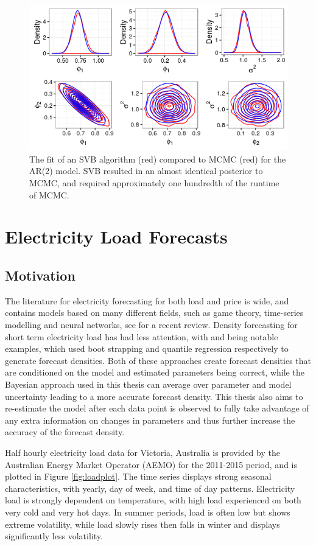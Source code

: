 \documentclass[12pt,a4paper]{article}%
\numberwithin{equation}{section}
\begin{document}
\begin{figure}[h]
\centering
\includegraphics[width=0.7\linewidth,height=\textheight,keepaspectratio]{VBfit.png}
\caption{The fit of an SVB algorithm (red) compared to MCMC (red) for the AR(2) model. SVB resulted in an almost identical posterior to MCMC, and required approximately one hundredth of the runtime of MCMC.}
\label{fig:VBfit}
\end{figure}

\section{Electricity Load Forecasts} \label{sec:ElecLoad}
\subsection{Motivation}

The literature for electricity forecasting for both load and price is wide, and contains models based on many different fields, such as game theory, time-series modelling and neural networks, see \citet{Weron2014} for a recent review. Density forecasting for short term electricity load has had less attention, with \citet{Fan2012} and \citet{He2016} being notable examples, which used boot strapping and quantile regression respectively to generate forecast densities. Both of these approaches create forecast densities that are conditioned on the model and estimated parameters being correct, while the Bayesian approach used in this thesis can average over parameter and model uncertainty leading to a more accurate forecast density. This thesis also aims to re-estimate the model after each data point is observed to fully take advantage of any extra information on changes in parameters and thus further increase the accuracy of the forecast density. 

Half hourly electricity load data for Victoria, Australia is provided by the Australian Energy Market Operator (AEMO) for the 2011-2015 period, and is plotted in Figure \ref{fig:loadplot}. The time series displays strong seasonal characteristics, with yearly, day of week, and time of day patterns. Electricity load is strongly dependent on temperature, with high load experienced on both very cold and very hot days. In summer periods, load is often low but shows extreme volatility, while load slowly rises then falls in winter and displays significantly less volatility. 
\end{document}
